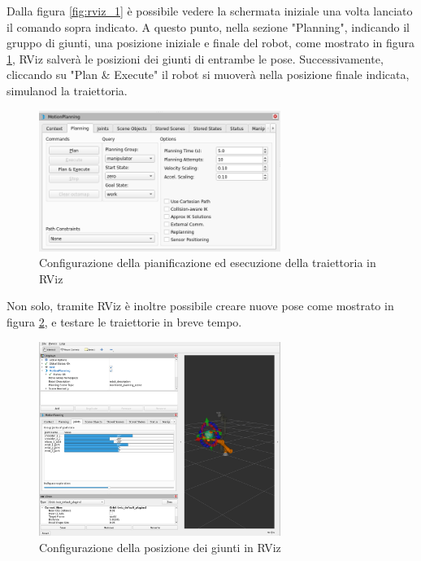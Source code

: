 \documentclass[11pt]{report}
\begin{document}
Dalla figura \ref{fig:rviz_1} è possibile vedere la schermata iniziale una volta lanciato il comando sopra indicato.
A questo punto, nella sezione "Planning", indicando il gruppo di giunti, una posizione iniziale e finale del robot, come mostrato in figura \ref{fig:rviz_2}, RViz salverà le posizioni dei giunti di entrambe le pose. Successivamente, cliccando su "Plan \& Execute" il robot si muoverà nella posizione finale indicata, simulanod la traiettoria.

\begin{figure}[H]
    \centering
    \includegraphics[width=0.7\textwidth]{images/rviz_2.PNG}
    \caption{Configurazione della pianificazione ed esecuzione della traiettoria in RViz}
    \label{fig:rviz_2}
\end{figure}

Non solo, tramite RViz è inoltre possibile creare nuove pose come mostrato in figura \ref{fig:rviz_3}, e testare le traiettorie in breve tempo.

\begin{figure}[H]
    \centering
    \includegraphics[width=0.7\textwidth]{images/rviz_3.PNG}
    \caption{Configurazione della posizione dei giunti in RViz}
    \label{fig:rviz_3}
\end{figure}
\end{document}
